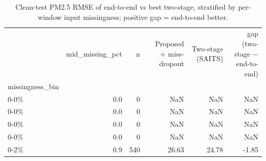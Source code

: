 \begin{table}
\caption{Clean-test PM2.5 RMSE of end-to-end vs best two-stage, stratified by per-window input missingness; positive gap = end-to-end better.}
\label{tab:stratified}
\begin{tabular}{lrrrrr}
\toprule
 & mid\_missing\_pct & n & Proposed + miss-dropout & Two-stage (SAITS) & gap (two-stage − end-to-end) \\
missingness_bin &  &  &  &  &  \\
\midrule
0-0\% & 0.0 & 0 & NaN & NaN & NaN \\
0-0\% & 0.0 & 0 & NaN & NaN & NaN \\
0-0\% & 0.0 & 0 & NaN & NaN & NaN \\
0-0\% & 0.0 & 0 & NaN & NaN & NaN \\
0-2\% & 0.9 & 540 & 26.63 & 24.78 & -1.85 \\
\bottomrule
\end{tabular}
\end{table}
